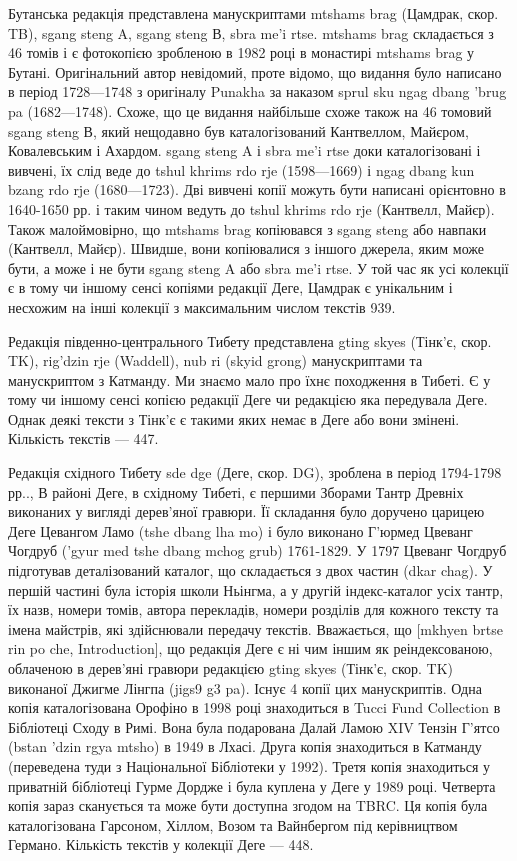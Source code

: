 Бутанська редакція представлена манускриптами mtshams brag (Цамдрак, скор. TB),
sgang steng A, sgang steng В, sbra me'i rtse. mtshams brag складається з
46 томів і є фотокопією зробленою в 1982 році в монастирі mtshams brag у
Бутані. Оригінальний автор невідомий, проте відомо, що видання було написано
в період 1728—1748 з оригіналу Punakha за наказом sprul sku ngag dbang 'brug
pa (1682—1748). Схоже, що це видання найбільше схоже також на 46 томовий sgang
steng В, який нещодавно був каталогізований Кантвеллом, Майєром, Ковалевським
і Ахардом. sgang steng A і sbra me'i rtse доки каталогізовані і вивчені,
їх слід веде до tshul khrims rdo rje (1598—1669) і ngag dbang kun
bzang rdo rje (1680—1723). Дві вивчені копії можуть бути написані
орієнтовно в 1640-1650 рр. і таким чином ведуть до tshul khrims rdo rje (Кантвелл, Майєр).
Також малоймовірно, що mtshams brag копіювався з sgang steng або
навпаки (Кантвелл, Майєр). Швидше, вони копіювалися з іншого джерела,
яким може бути, а може і не бути sgang steng A або sbra me'i rtse.
У той час як усі колекції є в тому чи іншому сенсі копіями редакції Деге,
Цамдрак є унікальним і несхожим на інші колекції з максимальним числом текстів 939.

Редакція південно-центрального Тибету представлена gting skyes (Тінк'є, скор. TK),
rig'dzin rje (Waddell), nub ri (skyid grong) манускриптами та манускриптом з Катманду.
Ми знаємо мало про їхнє походження в Тибеті. Є у тому чи іншому сенсі копією редакції
Деге чи редакцією яка передувала Деге. Однак деякі тексти з Тінк'є є такими яких
немає в Деге або вони змінені. Кількість текстів --- 447.

Редакція східного Тибету sde dge (Деге, скор. DG), зроблена в період 1794-1798 рр..,
В районі Деге, в східному Тибеті, є першими Зборами Тантр Древніх виконаних у
вигляді дерев'яної гравюри. Її складання було доручено царицею Деге Цевангом
Ламо (tshe dbang lha mo) і було виконано Г'юрмед Цвеванг Чогдруб ('gyur med
tshe dbang mchog grub) 1761-1829. У 1797 Цвеванг Чогдруб підготував деталізований
каталог, що складається з двох частин (dkar chag). У першій частині була
історія школи Ньінгма, а у другій індекс-каталог усіх тантр, їх назв, номери
томів, автора перекладів, номери розділів для кожного тексту та імена майстрів,
які здійснювали передачу текстів. Вважається, що [mkhyen brtse rin po che, Introduction],
що редакція Деге є ні чим іншим як реіндексованою, облаченою в дерев'яні гравюри
редакцією gting skyes (Тінк'є, скор. TK) виконаної Джигме Лінгпа (jigs9 g3 pa).
Існує 4 копії цих манускриптів. Одна копія каталогізована Орофіно в 1998 році
знаходиться в Tucci Fund Collection в Бібліотеці Сходу в Римі. Вона була
подарована Далай Ламою XIV Тензін Г'ятсо (bstan 'dzin rgya mtsho) в 1949 в Лхасі.
Друга копія знаходиться в Катманду (переведена туди з Національної Бібліотеки у 1992).
Третя копія знаходиться у приватній бібліотеці Гурме Дордже і була куплена у Деге у 1989 році.
Четверта копія зараз сканується та може бути доступна згодом на TBRC. Ця копія
була каталогізована Гарсоном, Хіллом, Возом та Вайнбергом під керівництвом Германо.
Кількість текстів у колекції Деге --- 448.

